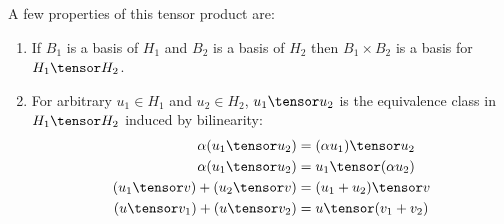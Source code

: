  
A few properties of this tensor
product are:
\begin{enumerate}
    \item If $B_1$ is a basis of $H_1$ and $B_2$ is a basis of $H_2$
    then $B_1 \times B_2$ is a basis for $H_1 \tensor H_2$.
    \item For arbitrary $u_1 \in H_1$ and $u_2 \in H_2$, 
    $u_1 \tensor u_2$ is the equivalence class in $H_1 \tensor H_2$ induced
    by bilinearity:
    \begin{align*}
        \alpha(u_1 \tensor u_2) &= (\alpha u_1) \tensor u_2 \\
        \alpha(u_1 \tensor u_2) &= u_1 \tensor (\alpha u_2) \\
        (u_1 \tensor v) + (u_2 \tensor v) &= (u_1 + u_2) \tensor v \\
        (u \tensor v_1) + (u \tensor v_2) &= u \tensor (v_1 + v_2)
    \end{align*}
\end{enumerate}

